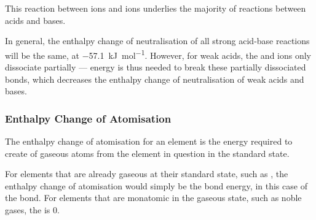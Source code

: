 				\pagebreak
				This reaction between  ions and  ions underlies the majority of reactions between acids and bases.


				In general, the enthalpy change of neutralisation of all strong acid-base reactions will be the same,
				at \SI{-57.1}{\kilo\joule\per\mole}. However, for weak acids, the  and  ions only dissociate
				partially --- energy is thus needed to break these partially dissociated bonds, which decreases the enthalpy change
				of neutralisation of weak acids and bases.





			\subsubsection{Enthalpy Change of Atomisation}

				The enthalpy change of atomisation for an element is the energy required to create  of gaseous atoms from the
				element in question in the standard state.


				For elements that are already gaseous at their standard state, such as , the enthalpy change of atomisation would
				simply be the bond energy, in this case of the  bond. For elements that are monatomic in the gaseous state,
				such as noble gases, the  is 0.



